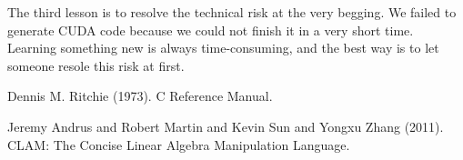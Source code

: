 \documentclass[12pt]{article} %
\begin{document}
The third lesson is to resolve the technical risk at the very begging. We failed to generate CUDA code because we could not finish it in a very short time. Learning something new is always time-consuming, and the best way is to let someone resole this risk at first. 




\begin{thebibliography}{99} %

Dennis M. Ritchie (1973).
\newblock C Reference Manual.

Jeremy Andrus and Robert Martin and Kevin Sun and Yongxu Zhang (2011).
\newblock CLAM: The Concise Linear Algebra Manipulation Language.

\end{thebibliography}

\end{document}
